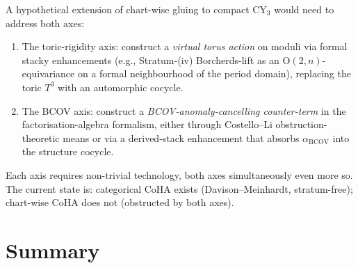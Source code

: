 \begin{remark}
\label{rem:extension-sketch}
A hypothetical extension of chart-wise gluing to compact CY$_3$ would
need to address both axes:
\begin{enumerate}[leftmargin=2em]
\item The toric-rigidity axis: construct a \emph{virtual torus action}
  on moduli via formal stacky enhancements (e.g., Stratum-(iv)
  Borcherds-lift as an $\mathrm{O}(2, n)$-equivariance on a formal
  neighbourhood of the period domain), replacing the toric $T^3$ with
  an automorphic cocycle.
\item The BCOV axis: construct a \emph{BCOV-anomaly-cancelling counter-term}
  in the factorisation-algebra formalism, either through Costello--Li
  obstruction-theoretic means or via a derived-stack enhancement that
  absorbs $\alpha_{\mathrm{BCOV}}$ into the structure cocycle.
\end{enumerate}
Each axis requires non-trivial technology, both axes simultaneously
even more so. The current state is: categorical CoHA exists
(Davison--Meinhardt, stratum-free); chart-wise CoHA does not (obstructed
by both axes).
\end{remark}

\section{Summary}
\label{sec:summary}

